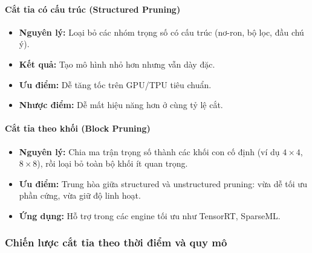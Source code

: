 \paragraph{Cắt tỉa có cấu trúc (Structured Pruning)}
\begin{itemize}
	\item \textbf{Nguyên lý:} Loại bỏ các nhóm trọng số có cấu trúc (nơ-ron, bộ lọc, đầu chú ý).
	\item \textbf{Kết quả:} Tạo mô hình nhỏ hơn nhưng vẫn dày đặc.
	\item \textbf{Ưu điểm:} Dễ tăng tốc trên GPU/TPU tiêu chuẩn.
	\item \textbf{Nhược điểm:} Dễ mất hiệu năng hơn ở cùng tỷ lệ cắt.
\end{itemize}

\paragraph{Cắt tỉa theo khối (Block Pruning)}
\begin{itemize}
	\item \textbf{Nguyên lý:} Chia ma trận trọng số thành các khối con cố định (ví dụ $4\times4$, $8\times8$), rồi loại bỏ toàn bộ khối ít quan trọng.
	\item \textbf{Ưu điểm:} Trung hòa giữa structured và unstructured pruning: vừa dễ tối ưu phần cứng, vừa giữ độ linh hoạt.
	\item \textbf{Ứng dụng:} Hỗ trợ trong các engine tối ưu như TensorRT, SparseML.
\end{itemize}

\begin{center}
	\label{fig:pruning_types}
\end{center}

\subsubsection{Chiến lược cắt tỉa theo thời điểm và quy mô}


